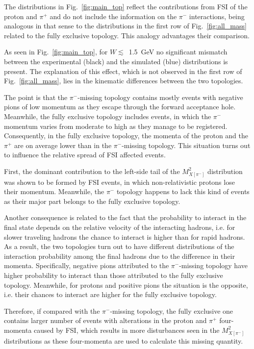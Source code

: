 The distributions in Fig.~\ref{fig:main_top} reflect the contributions from FSI of the proton and $\pi^{+}$ and do not include the information on the $\pi^{-}$ interactions, being analogous in that sense to the distributions in the first row of Fig.~\ref{fig:all_mass} related to the fully exclusive topology. This analogy advantages their comparison.



As seen in Fig.~\ref{fig:main_top}, for $W\lesssim$~1.5~GeV no significant mismatch between the experimental (black) and the simulated (blue) distributions is present. The explanation of this effect, which is not observed in the first row of Fig.~\ref{fig:all_mass}, lies in the kinematic differences between the two topologies.


The point is that the $\pi^{-}$-missing topology contains mostly events with negative pions of low momentum as they escape through the forward acceptance hole. Meanwhile, the fully exclusive topology includes events, in which the $\pi^{-}$ momentum varies from moderate to high as they manage to be registered. Consequently, in the fully exclusive topology, the momenta of the proton and the $\pi^{+}$ are on average lower than in the $\pi^{-}$-missing topology. This situation turns out to influence the relative spread of FSI affected events.  

First, the dominant contribution to the left-side tail of the $M^{2}_{X[\pi^{-}]}$ distribution was shown to be formed by FSI events, in which non-relativistic protons lose their momentum. Meanwhile, the $\pi^{-}$ topology happens to lack this kind of events as their major part belongs to the fully exclusive topology.

Another consequence is related to the fact that the probability to interact in the final state depends on the relative velocity of the interacting hadrons, i.e. for slower traveling hadrons the chance to interact is higher than for rapid hadrons. As a result, the two topologies turn out to have different distributions of the interaction probability among the final hadrons due to the difference in their momenta. Specifically, negative pions attributed to the $\pi^{-}$-missing topology have higher probability to interact than those attributed to the fully exclusive topology. Meanwhile, for protons and positive pions the situation is the opposite, i.e. their chances to interact are higher for the fully exclusive topology.

Therefore, if compared with the $\pi^{-}$-missing topology, the fully exclusive one contains larger number of events with alterations in the proton and $\pi^{+}$ four-momenta caused by FSI, which results in more disturbances seen in the $M^{2}_{X[\pi^{-}]}$ distributions as these four-momenta are used to calculate this missing quantity. 

